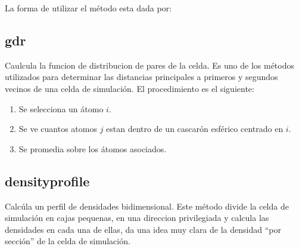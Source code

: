 La forma de utilizar el m\'etodo esta dada por:


\subsection{gdr}
Caulcula la funcion de distribucion de pares de la celda. Es uno de los m\'etodos utilizados para determinar las distancias principales a primeros y segundos vecinos de una celda de simulaci\'on. El procedimiento es el siguiente:
\begin{enumerate}
 \item Se selecciona un \'atomo $i$.
 \item Se ve cuantos atomos $j$ estan dentro de un cascar\'on esf\'erico centrado en $i$.
 \item Se promedia sobre los \'atomos asociados.
\end{enumerate}


\subsection{densityprofile}
Calc\'ula un perfil de densidades bidimensional. Este m\'etodo divide la celda de simulaci\'on en cajas pequenas, en una direccion privilegiada y calcula las densidades en cada una de ellas, da una idea muy clara de la densidad ``por secci\'on'' de la celda de simulaci\'on.

